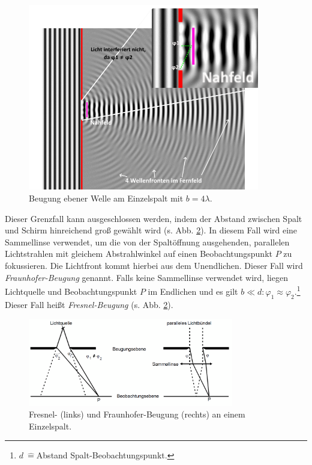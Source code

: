 \begin{figure}
    \centering
    \includegraphics[width=0.9\textwidth]{plots/Wave_Diffraction_4Lambda_Slit.png}
    \caption{Beugung ebener Welle am Einzelspalt mit $b = 4\lambda$.\protect\footnotemark\:\cite{OptischerspaltWiki}}        %
    \label{fig:waveDiff}
\end{figure}

Dieser Grenzfall kann ausgeschlossen werden, indem der Abstand zwischen Spalt und Schirm hinreichend groß gewählt wird (s. Abb. \ref{fig:fresnelFraunhofer}).
In diesem Fall wird eine Sammellinse verwendet, um die von der Spaltöffnung ausgehenden, parallelen Lichtstrahlen mit gleichem Abstrahlwinkel auf einen Beobachtungspunkt $P$ zu fokussieren. Die Lichtfront kommt hierbei aus dem Unendlichen. Dieser Fall wird \textit{Fraunhofer-Beugung} genannt.
Falls keine Sammellinse verwendet wird, liegen Lichtquelle und Beobachtungspunkt $P$ im Endlichen und es gilt $b \ll d : \varphi_1 \approx \varphi_2$.\:\footnote{$d\:\hat{=} $Abstand Spalt-Beobachtungspunkt.} Dieser Fall heißt \textit{Fresnel-Beugung} (s. Abb. \ref{fig:fresnelFraunhofer}).

\begin{figure}
    \centering
    \includegraphics[width=0.8\textwidth]{plots/Fresnel_Fraunhofer.png}
    \caption{Fresnel- (links) und Fraunhofer-Beugung (rechts) an einem Einzelspalt.\protect\footnotemark}
    \label{fig:fresnelFraunhofer}
\end{figure}

